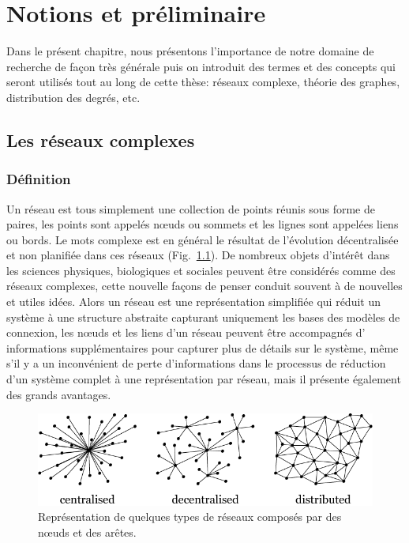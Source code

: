 %
\chapter{Notions et préliminaire}
Dans le présent chapitre, nous présentons l'importance de notre domaine de recherche de façon très générale puis on introduit des termes et des concepts qui seront utilisés tout au long de cette thèse: réseaux complexe, théorie des graphes, distribution des degrés, etc.
 \section{Les réseaux complexes}
  \subsection{Définition}
  Un \textsf{réseau} est tous simplement une collection de points réunis sous forme de paires, les points sont appelés nœuds ou sommets et les lignes sont appelées liens ou bords. Le mots \textsf{complexe} est en général le résultat de  l'évolution décentralisée et non planifiée dans ces réseaux (Fig.~\ref{exemples-reseaux}). De nombreux objets d'intérêt dans les sciences physiques, biologiques et sociales peuvent être considérés comme des réseaux complexes, cette nouvelle façons de penser conduit souvent à de nouvelles et utiles idées. Alors un réseau est une représentation simplifiée qui réduit un système à une structure abstraite capturant uniquement les bases des modèles de connexion, les nœuds et les liens d'un réseau peuvent être accompagnés d' informations supplémentaires pour capturer plus de détails sur le système, même s'il y a un inconvénient de perte d'informations dans le processus de réduction d'un système complet à une représentation par réseau, mais il présente également des grands avantages.
  
  \begin{figure}[h!]
  	\centering
  	\includegraphics[scale=0.55]{./figures/types-networks2}
  	\caption{Représentation de quelques types de réseaux composés par des nœuds et des arêtes. }
  	\label{exemples-reseaux}
  \end{figure}
